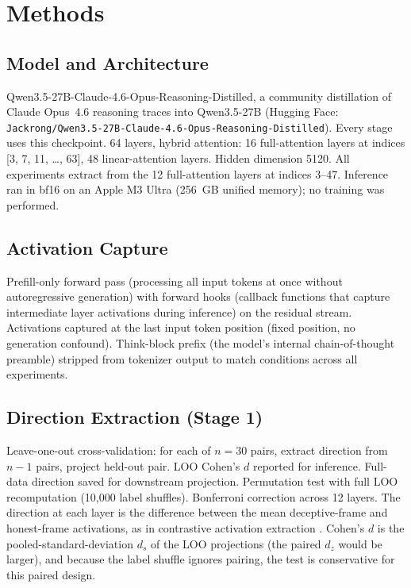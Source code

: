 \documentclass[11pt,letterpaper]{article}
\begin{document}
\section{Methods}\label{sec:methods}

\subsection{Model and Architecture}

Qwen3.5-27B-Claude-4.6-Opus-Reasoning-Distilled, a community distillation of Claude Opus~4.6
reasoning traces into Qwen3.5-27B (Hugging Face:
\nolinkurl{Jackrong/Qwen3.5-27B-Claude-4.6-Opus-Reasoning-Distilled}). Every stage uses this checkpoint. 64 layers, hybrid
attention: 16 full-attention layers at indices [3, 7, 11, \ldots, 63], 48 linear-attention layers.
Hidden dimension 5120. All experiments extract from the 12 full-attention layers at indices 3--47.
Inference ran in bf16 on an Apple M3 Ultra (256~GB unified memory); no training was performed.

\subsection{Activation Capture}

Prefill-only forward pass (processing all input tokens at once without autoregressive generation) with forward hooks (callback functions that capture intermediate layer activations during inference) on the residual stream. Activations captured at the
last input token position (fixed position, no generation confound). Think-block prefix (the model's internal chain-of-thought preamble) stripped from
tokenizer output to match conditions across all experiments.

\subsection{Direction Extraction (Stage 1)}

Leave-one-out cross-validation: for each of $n=30$ pairs, extract direction from $n-1$ pairs,
project held-out pair. LOO Cohen's $d$ reported for inference. Full-data direction saved for
downstream projection. Permutation test with full LOO recomputation (10{,}000 label shuffles).
Bonferroni correction across 12 layers. The direction at each layer is the difference between the
mean deceptive-frame and honest-frame activations, as in contrastive activation extraction
\cite{zou2023representation,panickssery2023steering}. Cohen's $d$ is the pooled-standard-deviation
$d_s$ of the LOO projections (the paired $d_z$ would be larger), and because the label shuffle ignores
pairing, the test is conservative for this paired design.
\end{document}

